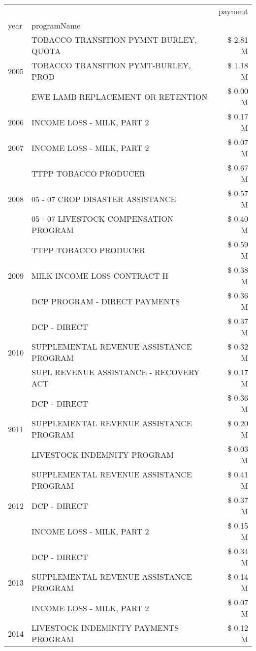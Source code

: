 \begin{tabular}{llr}
\toprule
 &  & payment \\
year & programName &  \\
\midrule
\multirow[t]{3}{*}{2005} & TOBACCO TRANSITION PYMNT-BURLEY, QUOTA & \$ 2.81 M \\
 & TOBACCO TRANSITION PYMT-BURLEY, PROD & \$ 1.18 M \\
 & EWE LAMB REPLACEMENT OR RETENTION & \$ 0.00 M \\
\cline{1-3}
2006 & INCOME LOSS - MILK, PART 2 & \$ 0.17 M \\
\cline{1-3}
2007 & INCOME LOSS - MILK, PART 2 & \$ 0.07 M \\
\cline{1-3}
\multirow[t]{3}{*}{2008} & TTPP TOBACCO PRODUCER & \$ 0.67 M \\
 & 05 - 07 CROP DISASTER ASSISTANCE & \$ 0.57 M \\
 & 05 - 07 LIVESTOCK COMPENSATION PROGRAM & \$ 0.40 M \\
\cline{1-3}
\multirow[t]{3}{*}{2009} & TTPP TOBACCO PRODUCER & \$ 0.59 M \\
 & MILK INCOME LOSS CONTRACT II & \$ 0.38 M \\
 & DCP PROGRAM - DIRECT PAYMENTS & \$ 0.36 M \\
\cline{1-3}
\multirow[t]{3}{*}{2010} & DCP - DIRECT & \$ 0.37 M \\
 & SUPPLEMENTAL REVENUE ASSISTANCE PROGRAM & \$ 0.32 M \\
 & SUPL REVENUE ASSISTANCE - RECOVERY ACT & \$ 0.17 M \\
\cline{1-3}
\multirow[t]{3}{*}{2011} & DCP - DIRECT & \$ 0.36 M \\
 & SUPPLEMENTAL REVENUE ASSISTANCE PROGRAM & \$ 0.20 M \\
 & LIVESTOCK INDEMNITY PROGRAM & \$ 0.03 M \\
\cline{1-3}
\multirow[t]{3}{*}{2012} & SUPPLEMENTAL REVENUE ASSISTANCE PROGRAM & \$ 0.41 M \\
 & DCP - DIRECT & \$ 0.37 M \\
 & INCOME LOSS - MILK, PART 2 & \$ 0.15 M \\
\cline{1-3}
\multirow[t]{3}{*}{2013} & DCP - DIRECT & \$ 0.34 M \\
 & SUPPLEMENTAL REVENUE ASSISTANCE PROGRAM & \$ 0.14 M \\
 & INCOME LOSS - MILK, PART 2 & \$ 0.07 M \\
\cline{1-3}
\multirow[t]{3}{*}{2014} & LIVESTOCK INDEMINITY PAYMENTS PROGRAM & \$ 0.12 M \\

\end{tabular}
